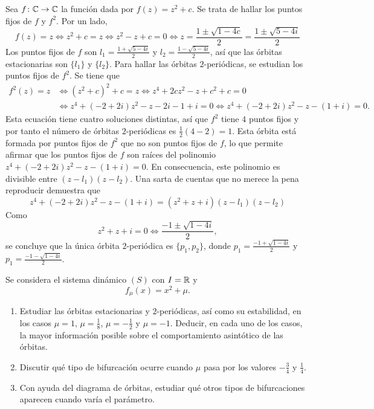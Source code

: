 \documentclass[11pt]{report}
\begin{document}
\begin{solution}
    Sea $f \colon \mathbb C \to \mathbb C$ la función dada por $f(z) = z^2+c$. Se trata de hallar los puntos fijos de $f$ y $f^2$. Por un lado,
    \[f(z) = z \iff z^2+c = z \iff z^2-z+c = 0 \iff z = \frac{1\pm \sqrt{1-4c}}{2} = \frac{1\pm \sqrt{5-4i}}{2}\]
    Los puntos fijos de $f$ son $l_1 = \frac{1+ \sqrt{5-4i}}{2}$ y $l_2 = \frac{1- \sqrt{5-4i}}{2}$, así que las órbitas estacionarias son $\{l_1\}$ y $\{l_2\}$. Para hallar las órbitas $2$-periódicas, se estudian los puntos fijos de $f^2$. Se tiene que
    \begin{align*}
        f^2(z) = z &\iff  (z^2+c)^2+c = z \iff z^4+2cz^2-z+c^2+c = 0 \\
        &\iff z^4+(-2+2i)z^2-z-2i-1+i = 0 \iff z^4+(-2+2i)z^2-z-(1+i) = 0.
    \end{align*}
    Esta ecuación tiene cuatro soluciones distintas, así que $f^2$ tiene $4$ puntos fijos y por tanto el número de órbitas $2$-periódicas es $\frac{1}{2}(4-2) = 1$. Esta órbita está formada por puntos fijos de $f^2$ que no son puntos fijos de $f$, lo que permite afirmar que los puntos fijos de $f$ son raíces del polinomio $z^4+(-2+2i)z^2-z-(1+i) = 0$. En consecuencia, este polinomio es divisible entre $(z-l_1)(z-l_2)$. Una sarta de cuentas que no merece la pena reproducir demuestra que
    \[z^4+(-2+2i)z^2-z-(1+i) = (z^2+z+i)(z-l_1)(z-l_2)\]
    Como
    \[z^2+z+i = 0 \iff \frac{-1\pm\sqrt{1-4i}}{2},\]
    se concluye que la única órbita $2$-periódica es $\{p_1,p_2\}$, donde $p_1 = \frac{-1+\sqrt{1-4i}}{2}$ y $p_1 = \frac{-1-\sqrt{1-4i}}{2}$.
\end{solution}

\begin{exercise}
    Se considera el sistema dinámico $(S)$ con $I = \mathbb R$ y
    \[f_\mu (x) = x^2+\mu.\]
    \begin{enumerate}
        \item Estudiar las órbitas estacionarias y $2$-periódicas, así como su estabilidad, en los casos $\mu = 1$, $\mu = \frac{1}{8}$, $\mu = -\frac{1}{2}$ y $\mu = -1$. Deducir, en cada uno de los casos, la mayor información posible sobre el comportamiento asintótico de las órbitas.
        \item Discutir qué tipo de bifurcación ocurre cuando $\mu$ pasa por los valores $-\frac{3}{4}$ y $\frac{1}{4}$.
        \item Con ayuda del diagrama de órbitas, estudiar qué otros tipos de bifurcaciones aparecen cuando varía el parámetro.
    \end{enumerate}
\end{exercise}
\end{document}
